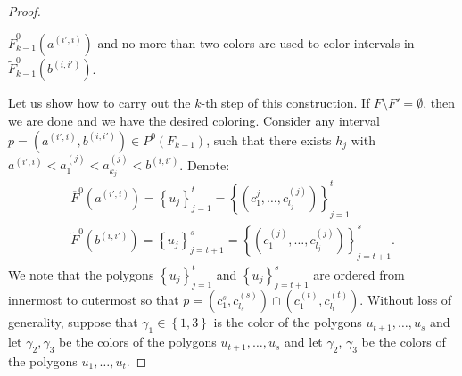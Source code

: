 \documentclass[12pt]{article}
\theoremstyle{definition}
\begin{document}
\begin{proof}
\begin{enumerate}
             $\overline{F}_{k-1}^{0}\left(a^{\left(i', i\right)}\right)$ 
             and no more than two colors are used
             to color intervals in
             $\widetilde{F}_{k-1}^{0}\left(b^{\left(i,i'\right)}\right)$.
         \end{enumerate}
         Let us show how to carry out
         the $k$-th step of this
         construction.
         If $F \setminus F' = \emptyset$,
         then we are done and we have
         the desired coloring.
         Consider any interval
         $p = \left(a^{\left(i', i\right)},
         b^{\left(i, i'\right)}\right)
         \in P^{0}\left(F_{k-1}\right)$,
         such that there
         exists $h_{j}$ with
         $a^{\left(i', i\right)} <
         a_1^{\left(j\right)} < a_{k_{j}}^{\left(j\right)}
         < b^{\left(i, i'\right)}$.
         Denote:
         \begin{gather*}
             \overline{F}^{0}\left(a^{\left(i', i\right)}\right) = 
             \left\{u_{j}\right\}_{j = 1}^{t} = 
             \left\{\left(c_1^{j}, \ldots, c_{l_{j}}^{\left(j\right)}\right)\right\}_{j =1}^{t} \\
             \widetilde{F}^{0}\left(b^{\left(i, i'\right)}\right) = 
             \left\{u_{j}\right\}_{j = t+1}^{s} = 
             \left\{\left(c_1^{\left(j\right)}, \ldots,
             c_{l_{j}}^{\left(j\right)}\right)\right\}_{j =t +1}^{s}.
         \end{gather*}
         We note that the polygons
         $\left\{u_{j}\right\}_{j=1}^{t}$ 
         and $\left\{u_{j}\right\}_{j=t+1}^{s}$ 
         are ordered from innermost
         to outermost so that
         $p = \left(c_1^{s}, c_{l_{s}}^{\left(s\right)}\right)
         \cap \left(c_1^{\left(t\right)},
         c_{l_{t}}^{\left(t\right)}\right)$.
         Without loss of generality,
         suppose that $\gamma_1 \in 
         \left\{1, 3\right\}$ is the
         color of the polygons 
         $u_{t+1}, \ldots, u_{s}$ 
         and let $\gamma_2, \gamma_3$
         be the colors of the polygons
         $u_{t+1}, \ldots, u_{s}$ 
         and let $\gamma_2$, $\gamma_3$
         be the colors of the polygons
         $u_1, \ldots, u_{t}$.
         

\end{proof}
\end{document}
